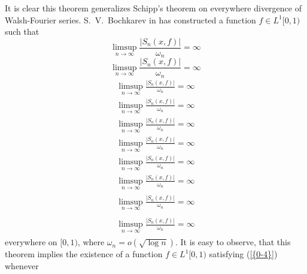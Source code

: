 \documentclass{amsart}
\numberwithin{equation}{section}
\begin{document}
It is clear this theorem generalizes Schipp's theorem on everywhere divergence of Walsh-Fourier series.  S.~V.~Bochkarev in \cite{Boch} has constructed a function $f\in L^1[0,1)$ such that
{
\begin{equation*} \label{0-5}
\limsup_{n\to\infty }\frac{|S_n(x,f)|}{\omega_n}=\infty
 \end{equation*}\fi  
{}\begin{equation}\label{0-5}
\limsup_{n\to\infty }\frac{|S_n(x,f)|}{\omega_n}=\infty
\end{equation}\fi   
{}\begin{align*}\label{0-5}
\limsup_{n\to\infty }\frac{|S_n(x,f)|}{\omega_n}=\infty
\end{align*}\fi   
{}\begin{align}\label{0-5}
\limsup_{n\to\infty }\frac{|S_n(x,f)|}{\omega_n}=\infty
\end{align}\fi    
{}\begin{gather*}\label{0-5}
\limsup_{n\to\infty }\frac{|S_n(x,f)|}{\omega_n}=\infty
\end{gather*}\fi  
{}\begin{gather}\label{0-5}
\limsup_{n\to\infty }\frac{|S_n(x,f)|}{\omega_n}=\infty
\end{gather}\fi   
{}\begin{multline*}\label{0-5}
\limsup_{n\to\infty }\frac{|S_n(x,f)|}{\omega_n}=\infty
\end{multline*}\fi  
{}\begin{multline}\label{0-5}
\limsup_{n\to\infty }\frac{|S_n(x,f)|}{\omega_n}=\infty
\end{multline}\fi  
{}\begin{multline*}\begin{split}\label{0-5}
\limsup_{n\to\infty }\frac{|S_n(x,f)|}{\omega_n}=\infty
\end{split}\end{multline*}\fi
{}\begin{multline}\begin{split}\label{0-5}
\limsup_{n\to\infty }\frac{|S_n(x,f)|}{\omega_n}=\infty
\end{split}\end{multline}\fi
}
everywhere on $[0,1)$, where $\omega_n=o(\sqrt {\log n })$. It is easy to observe, that this theorem implies the existence of a function $f\in L^1[0,1)$ satisfying {(\ref{{0-4}})} whenever
\end{document}

